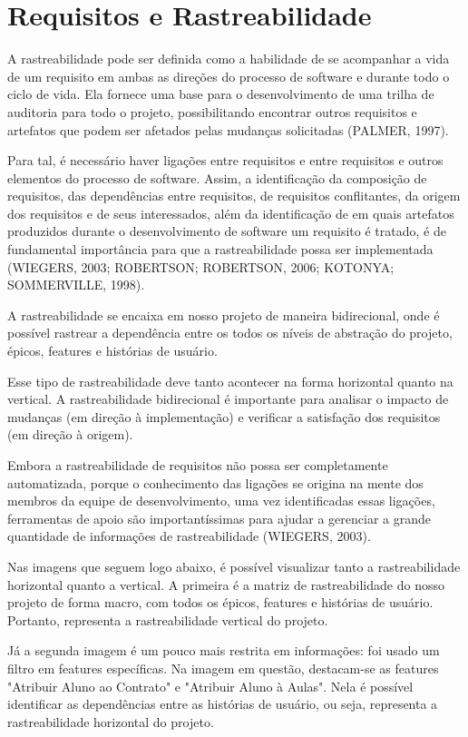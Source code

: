 \section[Requisitos e Rastreabilidade]{Requisitos e Rastreabilidade}
A rastreabilidade pode ser definida como a habilidade de se acompanhar a vida
de um requisito em ambas as direções do processo de software e durante todo o ciclo de
vida. Ela fornece uma base para o desenvolvimento de uma trilha de auditoria para todo
o projeto, possibilitando encontrar outros requisitos e artefatos que podem ser afetados
pelas mudanças solicitadas (PALMER, 1997). 

Para tal, é necessário haver ligações entre requisitos e entre requisitos e outros elementos do processo de software. Assim, a identificação da composição de requisitos, das dependências entre requisitos, de
requisitos conflitantes, da origem dos requisitos e de seus interessados, além da
identificação de em quais artefatos produzidos durante o desenvolvimento de software
um requisito é tratado, é de fundamental importância para que a rastreabilidade possa
ser implementada (WIEGERS, 2003; ROBERTSON; ROBERTSON, 2006;
KOTONYA; SOMMERVILLE, 1998). 

A rastreabilidade se encaixa em nosso projeto de maneira bidirecional, onde é
possível rastrear a dependência entre os todos os níveis de abstração do projeto,
épicos, features e histórias de usuário.

Esse tipo de rastreabilidade deve tanto acontecer na forma horizontal quanto
na vertical. A rastreabilidade bidirecional é importante para analisar o impacto
de mudanças (em direção à implementação) e verificar a satisfação dos
requisitos (em direção à origem).

Embora a rastreabilidade de requisitos não possa ser completamente
automatizada, porque o conhecimento das ligações se origina na mente dos membros da
equipe de desenvolvimento, uma vez identificadas essas ligações, ferramentas de apoio
são importantíssimas para ajudar a gerenciar a grande quantidade de informações de
rastreabilidade (WIEGERS, 2003). 

Nas imagens que seguem logo abaixo, é possível visualizar tanto a rastreabilidade horizontal quanto a vertical. A primeira é a matriz de rastreabilidade do nosso projeto de forma macro, com todos os épicos, features e histórias de usuário. Portanto, representa a rastreabilidade vertical do projeto.

Já a segunda imagem é um pouco mais restrita em informações: foi usado um filtro em features específicas. Na imagem em questão, destacam-se as features "Atribuir Aluno ao Contrato" e "Atribuir Aluno à Aulas". Nela é possível identificar as dependências entre as histórias de usuário, ou seja, representa a rastreabilidade horizontal do projeto.

